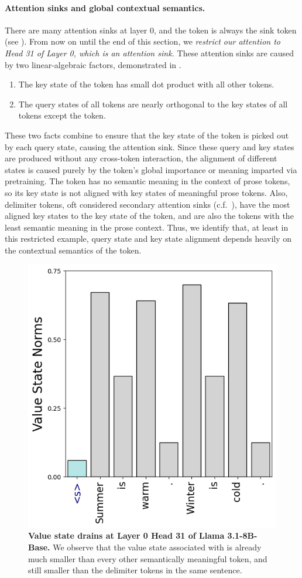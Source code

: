 \paragraph{Attention sinks and global contextual semantics.} There are many attention sinks at layer \(0\), and the \bos{} token is always the sink token (see ). From now on until the end of this section, we \textit{restrict our attention to Head 31 of Layer 0, which is an attention sink.} These attention sinks are caused by two linear-algebraic factors, demonstrated in .
\begin{enumerate}
    \item The key state of the \bos{} token has small dot product with all other tokens. 
    \item The query states of all tokens are nearly orthogonal to the key states of all tokens except the \bos{} token.
\end{enumerate}
 These two facts combine to ensure that the key state of the \bos{} token is picked out by each query state, causing the attention sink. Since these query and key states are produced without any cross-token interaction, the alignment of different states is caused purely by the token's global importance or meaning imparted via pretraining. The \bos{} token has no semantic meaning in the context of prose tokens, so its key state is not aligned with key states of meaningful prose tokens. Also, delimiter tokens, oft considered secondary attention sinks (c.f.~), have the most aligned key states to the key state of the \bos{} token, and are also the tokens with the least semantic meaning in the prose context. Thus, we identify that, at least in this restricted example, query state and key state alignment depends heavily on the contextual semantics of the token.

 \begin{figure}[h]
     \centering
     \includegraphics[width=0.4\linewidth]{Figures/llama_31_circuit/llama_31_value_states.png}
     \caption{\small \textbf{Value state drains at Layer 0 Head 31 of Llama 3.1-8B-Base.} We observe that the value state associated with \bos{} is already much smaller than every other semantically meaningful token, and still smaller than the delimiter tokens in the same sentence.}
     \label{fig:llama_31_value_states}
 \end{figure}

